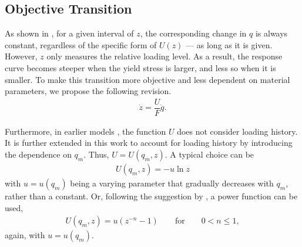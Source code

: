 \subsection{Objective Transition}\label{sec:obj_trans}
As shown in , for a given interval of $z$, the corresponding change in $q$ is always constant, regardless of the specific form of $U(z)$ --- as long as it is given.
However, $z$ only measures the relative loading level.
As a result, the response curve becomes steeper when the yield stress is larger, and less so when it is smaller.
To make this transition more objective and less dependent on material parameters, we propose the following revision.
\begin{gather}\label{eq:z_evolution_revised}
    \boxed{\dot{z}=\dfrac{U}{F}\dot{q}.}
\end{gather}

Furthermore, in earlier models \citep{Chang2025,Hashiguchi2024}, the function $U$ does not consider loading history.
It is further extended in this work to account for loading history by introducing the dependence on $q_m$.
Thus, $U=U\left(q_m,z\right)$.
A typical choice can be
\begin{gather}
    U\left(q_m,z\right)=-u\ln{z}
\end{gather}
with $u=u\left(q_m\right)$ being a varying parameter that gradually decreases with $q_m$, rather than a constant.
Or, following the suggestion by \citet{Chang2025}, a power function can be used,
\begin{gather}
    U\left(q_m,z\right)=u\left(z^{-n}-1\right)\qquad\text{for}\qquad0<n\leqslant1,
\end{gather}
again, with $u=u\left(q_m\right)$.
